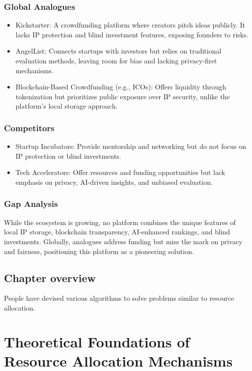 \documentclass[12pt]{article}
\begin{document}
\subsubsection{Global Analogues}
\begin{itemize}
    \item Kickstarter: A crowdfunding platform where creators pitch ideas publicly. It lacks IP protection and blind investment features, exposing founders to risks.
    \item AngelList: Connects startups with investors but relies on traditional evaluation methods, leaving room for bias and lacking privacy-first mechanisms.
    \item Blockchain-Based Crowdfunding (e.g., ICOs): Offers liquidity through tokenization but prioritizes public exposure over IP security, unlike the platform's local storage approach.
\end{itemize}

\subsubsection{Competitors}
\begin{itemize}
    \item Startup Incubators: Provide mentorship and networking but do not focus on IP protection or blind investments.
    \item Tech Accelerators: Offer resources and funding opportunities but lack emphasis on privacy, AI-driven insights, and unbiased evaluation.
\end{itemize}

\subsubsection{Gap Analysis}
While the ecosystem is growing, no platform combines the unique features of local IP storage, blockchain transparency, AI-enhanced rankings, and blind investments. Globally, analogues address funding but miss the mark on privacy and fairness, positioning this platform as a pioneering solution.

\subsection{Chapter overview}
People have devised various algorithms to solve problems similar to resource allocation.

\section{Theoretical Foundations of Resource Allocation Mechanisms}
\end{document}
